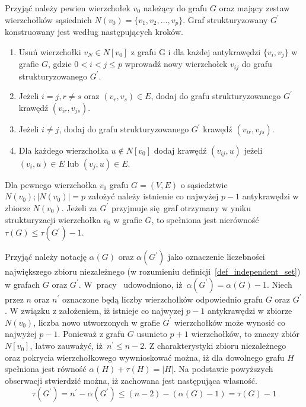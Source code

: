 {  Przyjąć należy pewien wierzchołek $v_0$ należący do grafu $G$ oraz mający zestaw wierzchołków sąsiednich $N(v_0)=\{v_1, v_2, \ldots, v_p\}$.
  Graf strukturyzowany $G^\prime$ konstruowany jest według następujących kroków.
  \begin{enumerate}
    \item Usuń wierzchołki $v_N \in N[v_0]$ z grafu G i dla każdej antykrawędzi $\{v_i, v_j\}$ w grafie $G$, gdzie $0 < i < j \leq p$ wprowadź nowy wierzchołek $v_{ij}$ do grafu strukturyzowanego $G^\prime$.
    \item Jeżeli $i=j, r\neq s$ oraz $(v_r, v_s) \in E$, dodaj do grafu strukturyzowanego $G^\prime$ krawędź $(v_{ir}, v_{js})$.
    \item Jeżeli $i \neq j$, dodaj do grafu strukturyzowanego $G^\prime$ krawędź $(v_{ir}, v_{js})$.
    \item Dla każdego wierzchołka $u \notin N[v_0]$ dodaj krawędź $(v_{ij}, u)$ jeżeli $(v_i, u) \in E$ lub $(v_j, u) \in E$.
  \end{enumerate}
  \begin{theorem}
    Dla pewnego wierzchołka $v_0$ grafu $G=(V, E)$ o sąsiedztwie $N(v_0); |N(v_0)|=p$ założyć należy istnienie co najwyżej $p-1$ antykrawędzi w zbiorze $N(v_0)$.
    Jeżeli za $G^\prime$ przyjmuje się graf otrzymany w yniku strukturyzacji wierzchołka $v_0$ w grafie $G$, to spełniona jest nierówność $\tau(G) \leq \tau(G^\prime) - 1$.
  \end{theorem}
  \begin{bproof}
    Przyjąć należy notację $\alpha(G)$ oraz $\alpha(G^\prime)$ jako oznaczenie liczebności największego zbioru niezależnego (w rozumieniu definicji~\ref{def_independent_set}) w grafach $G$ oraz $G^\prime$.
    W~pracy~\cite{Ebengger:1984} udowodniono, iż $\alpha(G^\prime)=\alpha(G) - 1$.
    Niech przez $n$ oraz $n^\prime$ oznaczone będą liczby wierzchołków odpowiednio grafu $G$ oraz $G^\prime$.
    W związku z założeniem, iż istnieje co najwyzej $p - 1$ antykrawędzi w zbiorze $N(v_0)$, liczba nowo utworzonych w grafie $G^\prime$ wierzchołków może wynosić co najwyżej $p - 1$.
    Ponieważ z grafu $G$ usunieto $p+1$ wierzchołków, to znaczy zbiór $N[v_0]$, łatwo zauważyć, iż $n^\prime \leq n-2$.
    Z charakterystyki zbioru niezależnego oraz pokrycia wierzchołkowego wywnioskować można, iż dla dowolnego grafu $H$ spełniona jest równość $\alpha(H)+\tau(H)=|H|$.
    Na podstawie powyższych obserwacji stwierdzić można, iż zachowana jest następująca własność.
    \[\tau(G^\prime)=n^\prime-\alpha(G^\prime)\leq (n-2)-(\alpha(G)-1)=\tau(G)-1\]
  \end{bproof}
}
